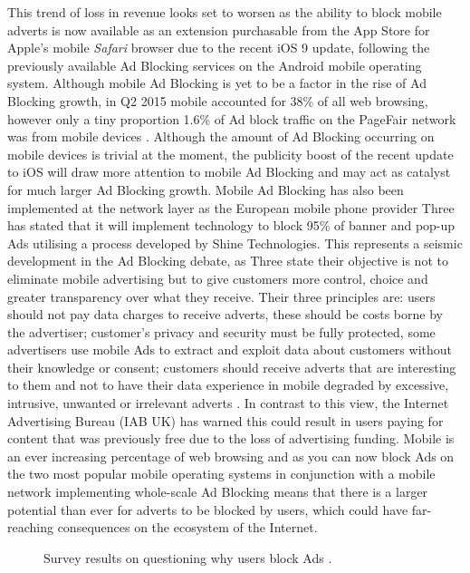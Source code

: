 \documentclass[12pt]{article}
\begin{document}
This trend of loss in revenue looks set to worsen as the ability to block mobile adverts is now available as an extension purchasable from the App Store for Apple's mobile \textit{Safari} browser due to the recent iOS 9 update, following the previously available Ad Blocking services on the Android mobile operating system. Although mobile Ad Blocking is yet to be a factor in the rise of Ad Blocking growth, in Q2 2015 mobile accounted for 38\% of all web browsing, however only a tiny proportion 1.6\% of Ad block traffic on the PageFair network was from mobile devices \parencite{adobeAdBlock}. Although the amount of Ad Blocking occurring on mobile devices is trivial at the moment, the publicity boost of the recent update to iOS will draw more attention to mobile Ad Blocking and may act as catalyst for  much larger Ad Blocking growth. Mobile Ad Blocking has also been implemented at the network layer as the European mobile phone provider Three has stated that it will implement technology to block 95\% of banner and pop-up Ads utilising a process developed by Shine Technologies. This represents a seismic development in the Ad Blocking debate, as Three state their objective is not to eliminate mobile advertising but to give customers more control, choice and greater transparency over what they receive. Their three principles are: users should not pay data charges to receive adverts, these should be costs borne by the advertiser; customer's privacy and security must be fully protected, some advertisers use mobile Ads to extract and exploit data about customers without their knowledge or consent; customers should receive adverts that are interesting to them and not to have their data experience in mobile degraded by excessive, intrusive, unwanted or irrelevant adverts \parencite{threeAdBlock}. In contrast to this view, the Internet Advertising Bureau (IAB UK) has warned this could result in users paying for content that was previously free due to the loss of advertising funding. Mobile is an ever increasing percentage of web browsing and as you can now block Ads on the two most popular mobile operating systems in conjunction with a  mobile network implementing whole-scale Ad Blocking means that there is a larger potential than ever for adverts to be blocked by users, which could have far-reaching consequences on the ecosystem of the Internet.  \\

\begin{figure} [H]
    \centering
        \caption{Survey results on questioning why users block Ads \parencite{publishersWeb}.}
        \label{fig:adBlockingChart}
\end{figure}
\end{document}
